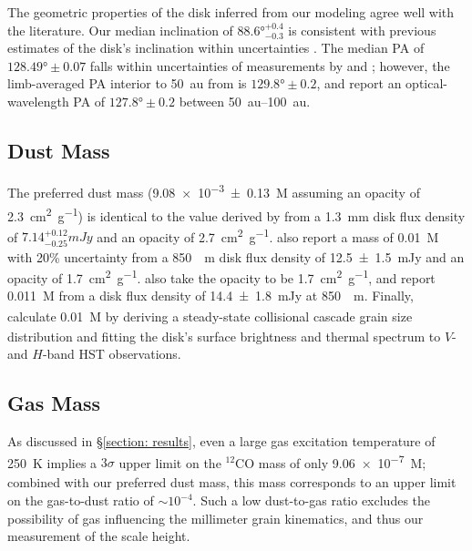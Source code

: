 \documentclass[modern]{aastex62}
\begin{document}
The geometric properties of the disk inferred from our modeling agree well with the literature. 
Our median inclination of $\ang[angle-symbol-over-decimal]{88.6}^{+0.4}_{-0.3}$ is consistent with previous estimates of the disk's inclination within uncertainties \citep{metchev05,krist05}.
The median PA of $\ang[angle-symbol-over-decimal]{128.49} \pm 0.07$ falls within uncertainties of measurements by \cite{macgregor13} and \cite{krist05}; however, the limb-averaged PA interior to \SI{50}{au} from \cite{metchev05} is $\ang[angle-symbol-over-decimal]{129.8} \pm 0.2$, and \cite{schneider14} report an optical-wavelength PA of $\ang[angle-symbol-over-decimal]{127.8} \pm 0.2$ between \SIrange{50}{100}{au}.

\subsection{Dust Mass}
\label{subsection: dust mass}

The preferred dust mass (\SI{9.08e-3 \pm 0.13}{M_\earth} assuming an opacity of \SI{2.3}{cm^2.g^{-1}}) is identical to the value derived by \cite{macgregor13} from a \SI{1.3}{mm} disk flux density of $7.14^{+0.12}_{-0.25} \si{mJy}$ and an opacity of \SI{2.7}{cm^2.g^{-1}}.
\cite{matthews15} also report a mass of \SI{0.01}{M_\earth} with 20\% uncertainty from a \SI{850}{\mu m} disk flux density of \SI{12.5 \pm 1.5}{mJy} and an opacity of \SI{1.7}{cm^2.g^{-1}}.
\cite{liu04} also take the opacity to be \SI{1.7}{cm^2.g^{-1}}, and report \SI{0.011}{M_\earth} from a disk flux density of \SI{14.4 \pm 1.8}{mJy} at \SI{850}{\mu m}.
Finally, \cite{strubbe&chiang06} calculate \SI{0.01}{M_\earth} by deriving a steady-state collisional cascade grain size distribution and fitting the disk's surface brightness and thermal spectrum to $V$- and $H$-band HST observations.


\subsection{Gas Mass}
\label{subsection: gas mass}

As discussed in \S \ref{section: results}, even a large gas excitation temperature of \SI{250}{K} implies a $3 \sigma$ upper limit on the $^{12}$CO mass of only \SI{9.06e-7}{M_\earth}; combined with our preferred dust mass, this mass corresponds to an upper limit on the gas-to-dust ratio of $\sim 10^{-4}$.
Such a low dust-to-gas ratio excludes the possibility of gas influencing the millimeter grain kinematics, and thus our measurement of the scale height.
\end{document}
